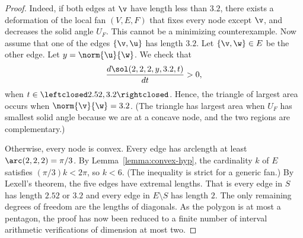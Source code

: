\begin{proof}
  Indeed,%
 if both edges at $\v$ have length less than $3.2$, there
exists a deformation of the local fan $(V,E,F)$ that fixes every node
except $\v$, and decreases the solid angle $U_F$.  This cannot be a
minimizing counterexample.  Now assume that one of the edges
$\{\v,\u\}$ has length $3.2$.  Let $\{\v,\w\}\in E$ be the other edge.
Let
$y=\norm{\u}{\w}$.  We check that
\[
\dfrac{d\sol(2,2,2,y,3.2,t)}{dt} >0,
\]
when $t\in\leftclosed2.52,3.2\rightclosed$.  Hence, the triangle of
largest area occurs when $\norm{\v}{\w}=3.2$.  (The triangle has
largest area when $U_F$ has smallest solid angle because we are at a
concave node, and the two regions are complementary.)


  Otherwise,
every node is convex.  Every edge has arclength at least
$\arc(2,2,2)=\pi/3$.  By Lemma~\ref{lemma:convex-hyp}, the cardinality
$k$ of $E$ satisfies $(\pi/3)k < 2\pi$, so $k<6$.  (The inequality is
strict for a generic fan.)  By Lexell's theorem, the five edges have
extremal lengths.  That is every edge in $S$ has length $2.52$ or
$3.2$ and every edge in $E\setminus S$ has length $2$.  The only
remaining degrees of freedom are the lengths of diagonals.  As the
polygon is at most a pentagon, the proof has now been reduced to a
finite number of interval arithmetic verifications of dimension at
most two.


\end{proof}

